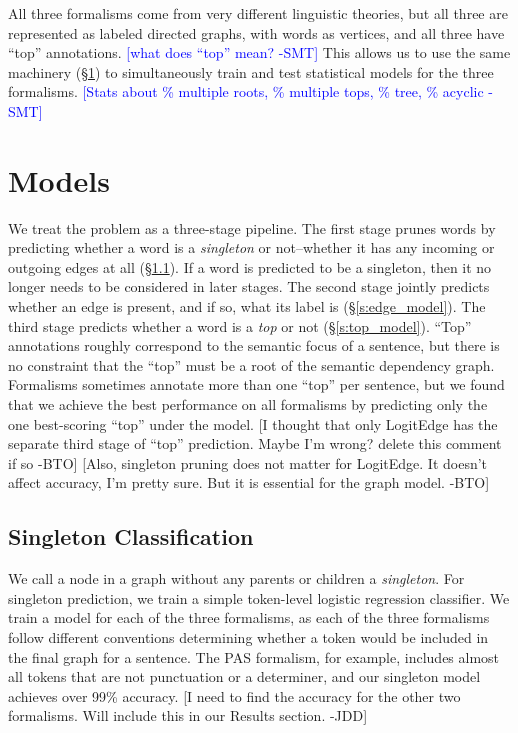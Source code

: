\documentclass[11pt]{article}
\newcommand{\bocomment}[1]{\textcolor{Bittersweet}{[#1 -BTO]}}
\newcommand{\sam}[1]{\textcolor{blue}{[#1 -SMT]}}
\newcommand{\jdcomment}[1]{\textcolor{NavyBlue}{[#1 -JDD]}}
\begin{document}
All three formalisms come from very different linguistic theories, but all
three are represented as labeled directed graphs, with words as vertices, and
all three have ``top'' annotations.
\sam{what does ``top'' mean?}
This allows us to use the same machinery (\S\ref{s:models}) to simultaneously
train and test statistical models for the three formalisms.
\sam{Stats about \% multiple roots, \% multiple tops, \% tree, \% acyclic}



\section{Models} \label{s:models}

We treat the problem as a three-stage pipeline.
The first stage prunes words by predicting whether a word is a \emph{singleton}
or not--whether it has any incoming or outgoing edges at all (\S\ref{s:singleton_model}).
If a word is predicted to be a singleton, then it no longer needs to be
considered in later stages.
The second stage jointly predicts whether an edge is
present, and if so, what its label is (\S\ref{s:edge_model}).
The third stage predicts whether a word is a \emph{top} or not
(\S\ref{s:top_model}).
``Top'' annotations roughly correspond to the semantic focus of a
sentence, but there is no constraint that the ``top'' must be a root of the
semantic dependency graph.
Formalisms sometimes annotate more than one ``top'' per sentence, but we
found that we achieve the best performance on all formalisms by predicting only
the one best-scoring ``top'' under the model.
\bocomment{I thought that only LogitEdge has the separate third stage of ``top'' prediction. Maybe I'm wrong? delete this comment if so}
\bocomment{Also, singleton pruning does not matter for LogitEdge.  It doesn't affect accuracy, I'm pretty sure.  But it is essential for the graph model.}


\subsection{Singleton Classification} \label{s:singleton_model}

We call a node in a graph without any parents or children a \emph{singleton}.
For singleton prediction, we train a simple token-level logistic regression
classifier.
We train a model for each of the three formalisms, as each of the three
formalisms follow different conventions determining whether a token would be
included in the final graph for a sentence.
The PAS formalism, for example, includes almost all tokens that are not
punctuation or a determiner, and our singleton model achieves over 99\%
accuracy.
\jdcomment{I need to find the accuracy for the other two formalisms. Will
include this in our Results section.}
\end{document}
